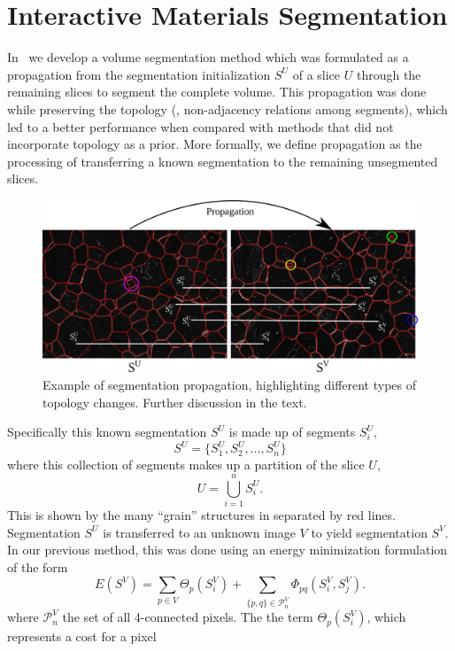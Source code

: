 \documentclass[]{spie}  %
\begin{document}
\section{Interactive Materials Segmentation}
\label{sec:interactive}

In~\cite{waggoner:11} we develop a volume segmentation method which
was formulated as a propagation from the segmentation initialization
$S^U$ of a slice $U$ through the remaining slices to segment the
complete volume.  This propagation was done while preserving the
topology (\ie, non-adjacency relations among segments), which led to a
better performance when compared with methods that did not incorporate
topology as a prior.  More formally, we define propagation as the
processing of transferring a known segmentation to the remaining
unsegmented slices.
\begin{figure}[htbp]
\centering
\includegraphics[width=\linewidth]{fig/dd}
\caption{Example of segmentation propagation, highlighting different
  types of topology changes.  Further discussion in the
  text.} \label{fig:full-ex}
\end{figure}
Specifically this known segmentation $S^U$ is made up of segments
$S^U_i$,
\[S^U = \{ S^U_1, S^U_2, \ldots, S^U_n \} \]
where this collection of segments makes up a partition of the slice
$U$,
\[ U = \bigcup_{i=1}^{n} S^U_i . \] This is shown by the many
``grain'' structures in  separated by red lines.
Segmentation $S^U$ is transferred to an unknown image $V$ to yield
segmentation $S^V$.  In our previous method, this was done using an
energy minimization formulation of the form
\begin{equation}
  E( S^V ) = \sum_{p\in V}\Theta_p(S^V_i) + 
  \sum_{\{p,q\}\in\mathcal{P}^V_n} \Phi_{pq}(S_i^V , S_j^V) .
\label{eq:energy1}
\end{equation}
where $\mathcal{P}^V_n$ the set of all 4-connected pixels.  The the
\data{} term $\Theta_p(S^V_i)$, which represents a cost for a pixel
\end{document}
